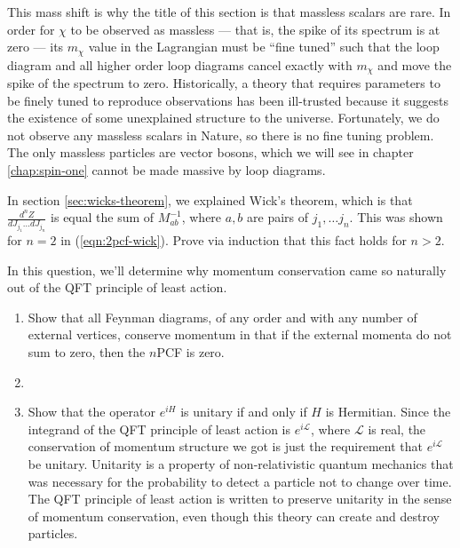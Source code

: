 This mass shift is why the title of this section is that massless scalars are rare. In order for $\chi$ to be observed as massless --- that is, the spike of its spectrum is at zero --- its $m_\chi$ value in the Lagrangian must be ``fine tuned'' such that the loop diagram and all higher order loop diagrams cancel exactly with $m_\chi$ and move the spike of the spectrum to zero. Historically, a theory that requires parameters to be finely tuned to reproduce observations has been ill-trusted because it suggests the existence of some unexplained structure to the universe. Fortunately, we do not observe any massless scalars in Nature, so there is no fine tuning problem. The only massless particles are vector bosons, which we will see in chapter \ref{chap:spin-one} cannot be made massive by loop diagrams.




\begin{problem}
  In section \ref{sec:wicks-theorem}, we explained Wick's theorem, which is that 
  $\frac{d^nZ}{d J_{j_1}\dots dJ_{j_n}}$ is equal the sum of $M^{-1}_{ab}$, where $a, b$ are pairs of $j_1,\dots j_n$. This was shown for $n=2$ in (\ref{eqn:2pcf-wick}). Prove via induction that this fact holds for $n>2$.
\end{problem}

\begin{problem}
  In this question, we'll determine why momentum conservation came so naturally out of the QFT principle of least action.
  \begin{enumerate}
    \item Show that all Feynman diagrams, of any order and with any number of external vertices, conserve momentum in that if the external momenta do not sum to zero, then the $n$PCF is zero.
    \item {}
    \item Show that the operator $e^{iH}$ is unitary if and only if $H$ is Hermitian. Since the integrand of the QFT principle of least action is $e^{i\mathcal{L}}$, where $\mathcal{L}$ is real, the conservation of momentum structure we got is just the requirement that $e^{i\mathcal{L}}$ be unitary. Unitarity is a property of non-relativistic quantum mechanics that was necessary for the probability to detect a particle not to change over time. The QFT principle of least action is written to preserve unitarity in the sense of momentum conservation, even though this theory can create and destroy particles.
  \end{enumerate}
\end{problem}

